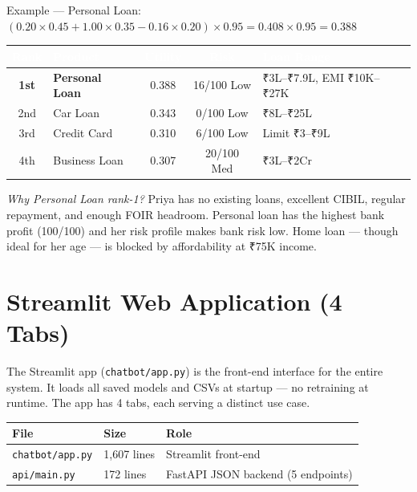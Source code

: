 \documentclass[12pt,a4paper]{article}
\begin{document}
Example — Personal Loan: $(0.20\times0.45 + 1.00\times0.35 - 0.16\times0.20)\times0.95 = 0.408\times0.95 = \mathbf{0.388}$

\begin{center}
\renewcommand{\arraystretch}{1.3}
\begin{tabular}{|c|l|c|c|p{5cm}|}
\hline
\rowcolor{darkblue}\textcolor{white}{\textbf{Rank}} & \textcolor{white}{\textbf{Product}} & \textcolor{white}{\textbf{Utility}} & \textcolor{white}{\textbf{Risk}} & \textcolor{white}{\textbf{Loan Range}} \\
\hline
\textbf{1st} & \textbf{Personal Loan} & 0.388 & 16/100 Low & ₹3L--₹7.9L, EMI ₹10K--₹27K \\
\hline
2nd & Car Loan & 0.343 & 0/100 Low & ₹8L--₹25L \\
\hline
3rd & Credit Card & 0.310 & 6/100 Low & Limit ₹3--₹9L \\
\hline
4th & Business Loan & 0.307 & 20/100 Med & ₹3L--₹2Cr \\
\hline
\end{tabular}
\end{center}

\textit{Why Personal Loan rank-1?} Priya has no existing loans, excellent CIBIL, regular repayment, and enough FOIR headroom. Personal loan has the highest bank profit (100/100) and her risk profile makes bank risk low.
Home loan — though ideal for her age — is blocked by affordability at ₹75K income.

\newpage
\section{Streamlit Web Application (4 Tabs)}

The Streamlit app (\texttt{chatbot/app.py}) is the front-end interface for the entire system. It loads all saved models and CSVs at startup — no retraining at runtime. The app has 4 tabs, each serving a distinct use case.

\begin{tabular}{lll}
\toprule
\textbf{File} & \textbf{Size} & \textbf{Role} \\
\midrule
\texttt{chatbot/app.py} & 1{,}607 lines & Streamlit front-end \\
\texttt{api/main.py}    & 172 lines     & FastAPI JSON backend (5 endpoints) \\
\bottomrule
\end{tabular}
\end{document}

